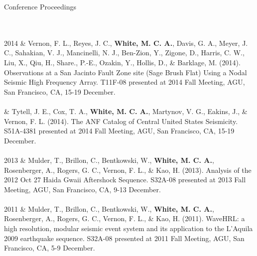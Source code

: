 \begin{rSection}{Conference Proceedings}
\begin{timeline}
			\\
			\\
		2014 
			& Vernon, F. L., Reyes, J. C., \textbf{White, M. C. A.}, Davis, G. A., Meyer, J. C., Sahakian, V. J., Mancinelli, N. J., Ben-Zion, Y., Zigone, D., Harris, C. W., Liu, X., Qiu, H., Share., P.-E., Ozakin, Y., Hollis, D., \& Barklage, M. (2014). Observations at a San Jacinto Fault Zone site (Sage Brush Flat) Using a Nodal Seismic High Frequency Array. T11F-08 presented at 2014 Fall Meeting, AGU, San Francisco, CA, 15-19 December.
			\\
			\\
			& Tytell, J. E., Cox, T. A., \textbf{White, M. C. A.}, Martynov, V. G., Eakins, J., \& Vernon, F. L. (2014). The ANF Catalog of Central United States Seismicity. S51A-4381 presented at 2014 Fall Meeting, AGU, San Francisco, CA, 15-19 December.
			\\
			\\
		2013
			& Mulder, T., Brillon, C., Bentkowski, W., \textbf{White, M. C. A.}, Rosenberger, A., Rogers, G. C., Vernon, F. L., \& Kao, H. (2013). Analysis of the 2012 Oct 27 Haida Gwaii Aftershock Sequence. S32A-08 presented at 2013 Fall Meeting, AGU, San Francisco, CA, 9-13 December.
			\\
			\\
		2011
			& Mulder, T., Brillon, C., Bentkowski, W., \textbf{White, M. C. A.}, Rosenberger, A., Rogers, G. C., Vernon, F. L., \& Kao, H. (2011). WaveHRL: a high resolution, modular seismic event system and its application to the L'Aquila 2009 earthquake sequence. S32A-08 presented at 2011 Fall Meeting, AGU, San Francisco, CA, 5-9 December.
	\end{timeline}
\end{rSection}